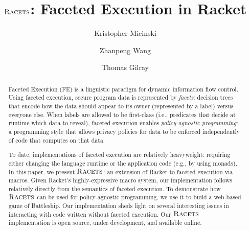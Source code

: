 \documentclass[review=true,acmlarge]{acmart}
\newcommand{\racets}[0]{$\textsc{Racets}$\xspace}
\begin{document}
\title{\racets: Faceted Execution in Racket}

\author{Kristopher Micinski}
\author{Zhanpeng Wang}
\author{Thomas Gilray}

\begin{abstract}
Faceted Execution (FE) is a linguistic paradigm for dynamic
information flow control. Using faceted execution, secure program data
is represented by \emph{facets}: decision trees that encode how the
data should appear to its owner (represented by a label) versus everyone
else. When labels are allowed to be first-class (i.e., predicates that
decide at runtime which data to reveal), faceted execution enables
\emph{policy-agnostic programming}: a programming style that allows
privacy policies for data to be enforced independently of code that
computes on that data.

To date, implementations of faceted execution are relatively
heavyweight: requiring either changing the language runtime or the
application code (e.g., by using monads). In this paper, we present
\racets: an extension of Racket to faceted execution via macros. Given
Racket's highly-expressive macro system, our implementation follows
relatively directly from the semantics of faceted execution. To
demonstrate how \racets can be used for policy-agnostic programming,
we use it to build a web-based game of Battleship. Our implementation
sheds light on several interesting issues in interacting with code
written without faceted execution. Our \racets implementation is open
source, under development, and available online.
\end{abstract}

\end{document}
